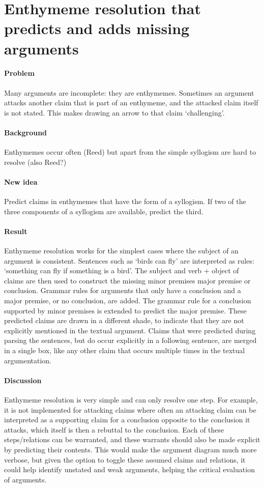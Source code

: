 \documentclass{article}
\let\stdsection\section
\renewcommand\section{\newpage\stdsection}
\begin{document}
\section{Enthymeme resolution that predicts and adds missing arguments}

\paragraph{Problem} Many arguments are incomplete: they are enthymemes. Sometimes an argument attacks another claim that is part of an enthymeme, and the attacked claim itself is not stated. This makes drawing an arrow to that claim `challenging'.
\paragraph{Background} Enthymemes occur often (Reed) but apart from the simple syllogism are hard to resolve (also Reed?)
\paragraph{New idea} Predict claims in enthymemes that have the form of a syllogism. If two of the three components of a syllogism are available, predict the third.
\paragraph{Result} Enthymeme resolution works for the simplest cases where the subject of an argument is consistent. Sentences such as `birds can fly' are interpreted as rules: `something can fly if something is a bird'. The subject and verb + object of claims are then used to construct the missing minor premises major premise or conclusion. Grammar rules for arguments that only have a conclusion and a major premise, or no conclusion, are added. The grammar rule for a conclusion supported by minor premises is extended to predict the major premise. These predicted claims are drawn in a different shade, to indicate that they are not explicitly mentioned in the textual argument. Claims that were predicted during parsing the sentences, but do occur explicitly in a following sentence, are merged in a single box, like any other claim that occurs multiple times in the textual argumentation.
\paragraph{Discussion} Enthymeme resolution is very simple and can only resolve one step. For example, it is not implemented for attacking claims where often an attacking claim can be interpreted as a supporting claim for a conclusion opposite to the conclusion it attacks, which itself is then a rebuttal to the conclusion. Each of these steps/relations can be warranted, and these warrants should also be made explicit by predicting their contents. This would make the argument diagram much more verbose, but given the option to toggle these assumed claims and relations, it could help identify unstated and weak arguments, helping the critical evaluation of arguments.
\end{document}
